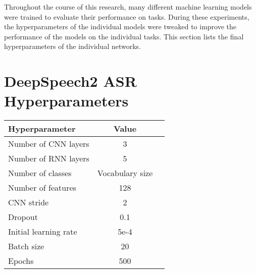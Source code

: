 Throughout the course of this research, many different machine learning models were
trained to evaluate their performance on tasks. During these experiments,
the hyperparameters of the individual models were tweaked to improve the performance of
the models on the individual tasks. This section lists the final hyperparameters of
the individual networks.

\section{DeepSpeech2 ASR Hyperparameters}


{\small\begin{center}
\begin{tabular} { | l | c | c | }
\hline
Hyperparameter & Value \\
\hline
Number of CNN layers & 3 \\
Number of RNN layers & 5 \\
Number of classes & Vocabulary size \\
Number of features & 128 \\
CNN stride & 2 \\
Dropout & 0.1 \\
Initial learning rate & 5e-4 \\
Batch size & 20 \\
Epochs & 500 \\
\hline
\end{tabular}
\end{center}}